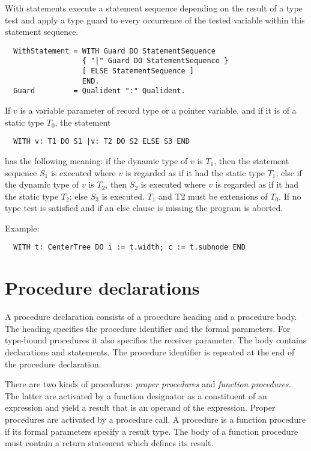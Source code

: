 With statements execute a statement sequence depending on the result
of a type test and apply a type guard to every occurrence of the tested
variable within this statement sequence.
{\BNFsize
\begin{verbatim}
  WithStatement = WITH Guard DO StatementSequence
                  { "|" Guard DO StatementSequence }
                  [ ELSE StatementSequence ]
                  END.
  Guard         = Qualident ":" Qualident.
\end{verbatim}}
If $v$ is a variable parameter of record type or a pointer variable,
and if it is of a static type $T_0$, the statement
\begin{verbatim}
  WITH v: T1 DO S1 |v: T2 DO S2 ELSE S3 END
\end{verbatim}
has the following meaning: if the dynamic type of $v$ is $T_1$, then the
statement sequence $S_1$ is executed where $v$ is regarded as if it had
the static type $T_1$; else if the dynamic type of $v$ is $T_2$, then $S_2$ is
executed where $v$ is regarded as if it had the static type $T_2$; else
$S_3$ is executed. $T_1$ and T2 must be extensions of $T_0$. If no type test
is satisfied and if an else clause is missing the program is aborted.

\noindent
Example:
\begin{verbatim}
  WITH t: CenterTree DO i := t.width; c := t.subnode END
\end{verbatim}

\section{Procedure declarations}\label{o2r:proc:dcl}

A procedure declaration consists of a procedure heading and a procedure
body. The heading specifies the procedure identifier and the formal
parameters. For type-bound procedures it also specifies the receiver
parameter. The body contains declarations and statements. The procedure
identifier is repeated at the end of the procedure declaration.

There are two kinds of procedures: {\em proper procedures} and {\em function
procedures.} The latter are activated by a function designator as
a constituent of an expression and yield a result that is an operand
of the expression. Proper procedures are activated by a procedure
call. A procedure is a function procedure if its formal parameters
specify a result type. The body of a function procedure must contain
a return statement which defines its result.

